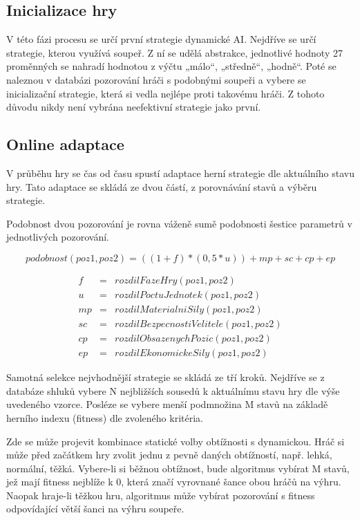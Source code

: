 \subsection{Inicializace hry}

V této fázi procesu se určí první strategie dynamické AI. Nejdříve se určí strategie, kterou využívá soupeř. Z ní se udělá abstrakce, jednotlivé hodnoty 27 proměnných se nahradí hodnotou z výčtu „málo“, „středně“, „hodně“.  Poté se naleznou v databázi pozorování hráči s podobnými soupeři a vybere se inicializační strategie, která si vedla nejlépe proti takovému hráči. Z tohoto důvodu nikdy není vybrána neefektivní strategie jako první.

\subsection{Online adaptace}

V průběhu hry se čas od času spustí adaptace herní strategie dle aktuálního stavu hry. Tato adaptace se skládá ze dvou částí, z porovnávání stavů a výběru strategie.

Podobnost dvou pozorování je rovna váženě sumě podobnosti šestice parametrů v jednotlivých pozorování.

\begin{equation}
	   podobnost(poz1,poz2)=((1+f)*(0,5*u)) + mp + sc + cp + ep
\end{equation}

\begin{eqnarray*}
f &= &rozdilFazeHry(poz1,poz2) \\
u &= &rozdilPoctuJednotek(poz1,poz2) \\
mp &= &rozdilMaterialniSily(poz1,poz2) \\
sc &= &rozdilBezpecnostiVelitele(poz1,poz2) \\
cp &= &rozdilObsazenychPozic(poz1,poz2) \\
ep &= &rozdilEkonomickeSily(poz1,poz2)
\end{eqnarray*}

Samotná selekce nejvhodnější strategie se skládá ze tří kroků. Nejdříve se z databáze shluků vybere N nejbližších sousedů k aktuálnímu stavu hry dle výše uvedeného vzorce. Posléze se vybere menší podmnožina M stavů na základě herního indexu (fitness) dle zvoleného kritéria.

Zde se může projevit kombinace statické volby obtížnosti s dynamickou. Hráč si může před začátkem hry zvolit jednu z pevně daných obtížností, např. lehká, normální, těžká. Vybere-li si běžnou obtížnost, bude algoritmus vybírat M stavů, jež mají fitness nejblíže k 0, která značí vyrovnané šance obou hráčů na výhru. Naopak hraje-li těžkou hru, algoritmus může vybírat pozorování s fitness odpovídající větší šanci na výhru soupeře.

